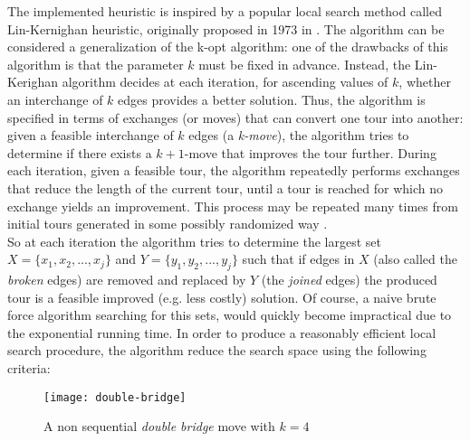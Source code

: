 The implemented heuristic is inspired by a popular local search method called Lin-Kernighan heuristic, originally proposed in 1973 in \cite{LinK73}. The algorithm can be considered a generalization of the k-opt algorithm: one of the drawbacks of this algorithm is that the parameter $k$ must be fixed in advance. Instead, the Lin-Kerighan algorithm decides at each iteration, for ascending values of $k$, whether an interchange of $k$ edges provides a better solution. Thus, the algorithm is specified in terms of exchanges (or moves) that can convert one tour into another: given a feasible interchange of $k$ edges (a \textit{k-move}), the algorithm tries to determine if there exists a $k+1$-move that improves the tour further. 
During each iteration, given a feasible tour, the algorithm repeatedly performs exchanges that reduce the length of the current tour, until a tour is reached for which no exchange yields an improvement. This process may be repeated many times from initial tours generated in some possibly randomized way \cite{Helsgaun2000}.\\
So at each iteration the algorithm tries to determine the largest set $X=\{x_1, x_2, ..., x_j\}$ and $Y=\{y_1, y_2, ..., y_j\}$ such that if edges in $X$ (also called the \emph{broken} edges) are removed and replaced by $Y$ (the \emph{joined} edges) the produced tour is a feasible improved (e.g. less costly) solution. Of course, a naive brute force algorithm searching for this sets, would quickly become impractical due to the exponential running time. In order to produce a reasonably efficient local search procedure, the algorithm reduce the search space using the following criteria:
\begin{figure}[]
	\centering
	\texttt{[image: double-bridge]}
	\caption{A non sequential \emph{double bridge} move with $k=4$}
	\label{fig:doublebridge}
\end{figure}

